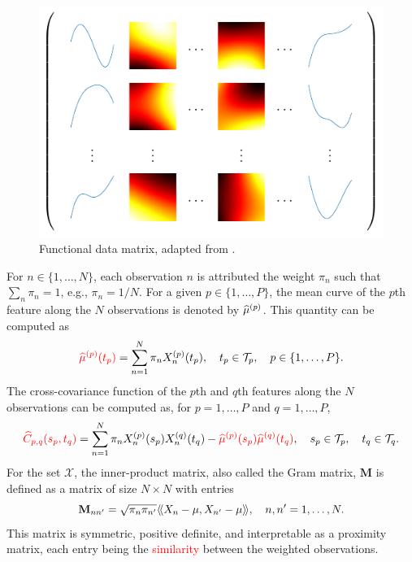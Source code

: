 \begin{figure}
    \centering
    \includegraphics[]{figures/data_matrix.pdf}
    \caption{Functional data matrix, adapted from \cite{berrenderoPrincipalComponentsMultivariate2011}.}
    \label{fig:data_matrix}
\end{figure}

For $n \in \{1, \dots, N\}$, each observation $n$ is attributed the weight $\pi_n$ such that $\sum_n \pi_n = 1$, e.g., $\pi_n = 1/N$.
For a given $p \in \{1, \dots, P\}$, the mean curve of the $p$th feature along the $N$ observations is denoted by \textcolor{red}{$\widehat{\mu}^{(p)}$}. This quantity can be computed as 
\begin{equation*}\label{eq:mu_estimation}
    \textcolor{red}{\widehat{\mu}^{(p)}(t_p)} = \sum_{n = 1}^N \pi_nX_n^{(p)}(t_p), \quad t_p \in \mathcal{T}_{p}, \quad p \in \{1, \dots, P\}.
\end{equation*}
The cross-covariance function of the $p$th and $q$th features along the $N$ observations can be computed as, for $p = 1, \dots, P$ and $q = 1, \dots, P$,
\begin{equation}\label{eq:cov_estimation}
    \textcolor{red}{\widehat{C}_{p, q}(s_p, t_q)} = \sum_{n = 1}^N \pi_nX_n^{(p)}(s_p)X_n^{(q)}(t_q) - \textcolor{red}{\widehat{\mu}^{(p)}(s_p)\widehat{\mu}^{(q)}(t_q)}, \quad s_p \in \mathcal{T}_{p}, \quad t_q \in \mathcal{T}_{q}.
\end{equation}
For the set $\mathcal{X}$, the inner-product matrix, also called the Gram matrix, $\mathbf{M}$ is defined as a matrix of size $N \times N$ with entries
\begin{equation}\label{eq:gram_mat}
    \mathbf{M}_{nn^\prime} = \sqrt{\pi_n \pi_{n^{\prime}}}\langle\!\langle X_n - \mu, X_{n^\prime} - \mu\rangle\!\rangle, \quad n, n^\prime = 1, \dots, N.
\end{equation}
This matrix is symmetric, positive definite, and interpretable as a proximity matrix, each entry being the \textcolor{red}{similarity} between the weighted observations.


